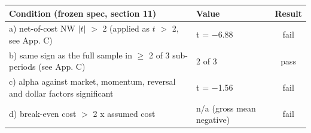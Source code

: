 \begin{tabular}{p{}lc}
\toprule
Condition (frozen spec, section 11) & Value & Result \\
\midrule
a) net-of-cost NW $|t|$ $>$ 2 (applied as $t$ $>$ 2, see App. C) & t = $-$6.88 & fail \\
b) same sign as the full sample in $\geq$ 2 of 3 sub-periods (see App. C) & 2 of 3 & pass \\
c) alpha against market, momentum, reversal and dollar factors significant & t = $-$1.56 & fail \\
d) break-even cost $>$ 2 x assumed cost & n/a (gross mean negative) & fail \\
\bottomrule
\end{tabular}
